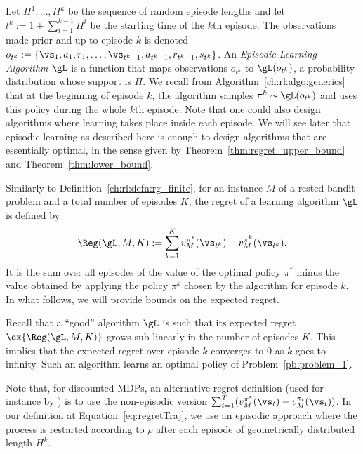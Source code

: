 Let $H^1,\ldots, H^k$ be the sequence of random episode lengths and let
$t^k:=1{+}\sum_{i=1}^{k-1}H^i$ be the starting time of the $k$th episode.
The observations made prior and up to episode \(k\) is denoted \(o_{t^{k}}:=\{\vs_1,a_1,r_1,\dots,\vs_{t^k-1},a_{t^k-1},r_{t^k-1},s_{t^k}\}\).
An \emph{Episodic Learning
Algorithm} \(\gL\) is a function that maps observations \(o_{t^k}\) to
\(\gL(o_{t^k})\), a probability distribution whose support is $\Pi$.
We recall from Algorithm~\ref{ch:rl:algo:generics} that at the
beginning of episode $k$, the algorithm samples \(\pi^k\sim\gL(o_{t^k})\)
and uses this policy during the whole $k$th episode. Note that one could also
design algorithms where learning takes place inside each episode. We will see
later that episodic learning as described here is enough to design algorithms
that are essentially optimal, in the sense given by Theorem~\ref{thm:regret_upper_bound} and Theorem~\ref{thm:lower_bound}.

Similarly to Definition~\ref{ch:rl:defn:rg_finite}, for an instance \(M\) of a rested bandit problem and a total number of episodes $K$, the regret of a learning algorithm \(\gL\) is defined by
\begin{align}
  \Reg(\gL,M,K) :=  \sum_{k=1}^K %
      v^{\pi^*}_M(\vs_{t^k}) - v^{\pi^k}_M(\vs_{t^k})%
      .\label{eq:regretTraj}
\end{align}
It is the sum over all episodes of the value of the optimal policy $\pi^*$ minus the value obtained by applying the policy $\pi^k$ chosen by the algorithm for episode $k$. In what follows, we will provide bounds on the expected regret.

Recall that a ``good'' algorithm $\gL$ is such that its expected regret $\ex{\Reg(\gL,M,K)}$ grows sub-linearly in the number of episodes $K$. This implies that the expected regret over episode $k$  converges to $0$ as $k$ goes to infinity. Such an algorithm learns an optimal policy of Problem~\ref{pb:problem_1}.

Note that, for discounted MDPs, an alternative regret definition (used for instance by \cite{zhou2021nearly}) is to use the non-episodic version $\sum_{t=1}^T (v^{\pi^*}_M(\vs_{t}) - v^{\pi_t}_M(\vs_{t}))$. In our definition at Equation~\eqref{eq:regretTraj}, we use an episodic approach where the process is restarted according to $\rho$ after each episode of geometrically distributed length $H^k$.


